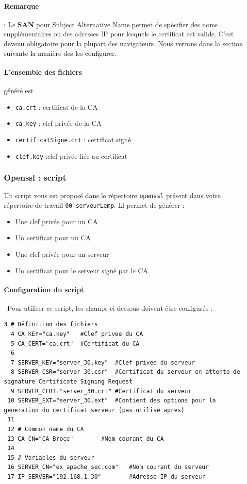 \documentclass[french, 12pt]{article}%
\newcommand{\itemE}{\item[$\bullet$]}
\begin{document}
\paragraph{Remarque } :  Le \textbf{SAN} pour Subject Alternative Name permet de spécifier des noms supplémentaires ou des adresses IP pour lesquels le certificat est valide. C'est devenu obligatoire pour la plupart des navigateurs.  Nous verrons dans la section suivante la manière des les configurer.


\paragraph{L'ensemble des fichiers } généré est 
\begin{itemize}
\itemE \verb?ca.crt? : certificat de la CA
\itemE \verb?ca.key? : clef privée de la CA
\itemE \verb?certificatSigne.crt? : certificat signé
\itemE \verb?clef.key? :clef privée liée au certificat
\end{itemize}

\subsubsection{Openssl : script}
\label{lbl_script}
Un script vous est proposé dans le répertoire \verb?openssl? présent dans votre répertoire de travail \verb?00-serveurLemp?. Ll permet de générer : 
\begin{itemize}
\itemE Une clef privée pour un CA
\itemE Un certificat pour un CA
\itemE Une clef privée pour un serveur
\itemE Un certificat pour le serveur signé par le CA.
\end{itemize}

\paragraph{Configuration du script} \ 
Pour utiliser ce script, les champs ci-dessous doivent être configurés : 

\begin{lstlisting}[style=commande]
  3 # Définition des fichiers
  4 CA_KEY="ca.key"   #Clef privee du CA
  5 CA_CERT="ca.crt"  #Certificat du CA
  6 
  7 SERVER_KEY="server_30.key"  #Clef privee du serveur
  8 SERVER_CSR="server_30.csr"  #Certificat du serveur en attente de signature Certificate Signing Request
  9 SERVER_CERT="server_30.crt" #Certificat du serveur
 10 SERVER_EXT="server_30.ext"  #Contient des options pour la generation du certificat serveur (pas utilise apres)
 11 
 12 # Common name du CA
 13 CA_CN="CA_Broce"        #Nom courant du CA
 14 
 15 # Variables du serveur
 16 SERVER_CN="ex_apache_sec.com"   #Nom courant du serveur
 17 IP_SERVER="192.168.1.30"        #Adresse IP du serveur    
\end{lstlisting}
\end{document}
